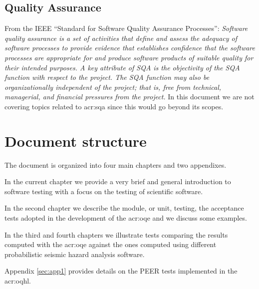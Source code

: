 \subsection{Quality Assurance}
From the IEEE ``Standard for Software Quality Assurance Processes'':
\emph{Software quality assurance is a set of activities that define and 
assess the adequacy of software processes to provide evidence that establishes 
confidence that the software processes are appropriate for and produce 
software products of suitable quality for their intended purposes. 
A key attribute of SQA is the objectivity of the SQA function with 
respect to the project. The SQA function may also be organizationally 
independent of the project; that is, free from technical, managerial, 
and financial pressures from the project.} In this document we are not 
covering topics related to \gls{acr:sqa} since this would go beyond its
scopes.  
%
\section{Document structure}
The document is organized into four main chapters and two appendixes.
 
In the current chapter we provide a very brief and general introduction 
to software testing with a focus on the testing of scientific software. 
 
In the second chapter we describe the module, or unit, testing, 
the acceptance tests adopted in the development of the 
\gls{acr:oqe} and we discuss some examples. 
 
In the third and fourth chapters we illustrate tests comparing 
the results computed with the \gls{acr:oqe} against the ones 
computed using different probabilistic seismic hazard analysis 
software.
  
Appendix \ref{sec:app1} provides details on the PEER tests 
implemented in the \gls{acr:oqhl}.
